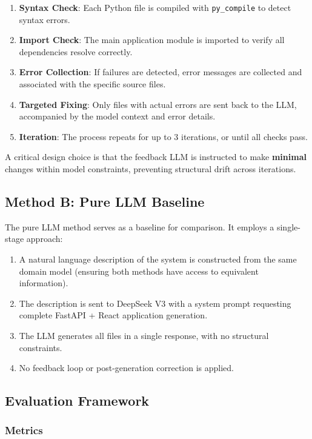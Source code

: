 \documentclass[11pt,a4paper]{article}
\begin{document}
\begin{enumerate}[leftmargin=*]
    \item \textbf{Syntax Check}: Each Python file is compiled with {\lstinline|py_compile|} to detect syntax errors.
    \item \textbf{Import Check}: The main application module is imported to verify all dependencies resolve correctly.
    \item \textbf{Error Collection}: If failures are detected, error messages are collected and associated with the specific source files.
    \item \textbf{Targeted Fixing}: Only files with actual errors are sent back to the LLM, accompanied by the model context and error details.
    \item \textbf{Iteration}: The process repeats for up to 3 iterations, or until all checks pass.
\end{enumerate}

A critical design choice is that the feedback LLM is instructed to make \textbf{minimal} changes within model constraints, preventing structural drift across iterations.

\subsection{Method B: Pure LLM Baseline}

The pure LLM method serves as a baseline for comparison. It employs a single-stage approach:

\begin{enumerate}[leftmargin=*]
    \item A natural language description of the system is constructed from the same domain model (ensuring both methods have access to equivalent information).
    \item The description is sent to DeepSeek V3 with a system prompt requesting complete FastAPI + React application generation.
    \item The LLM generates all files in a single response, with no structural constraints.
    \item No feedback loop or post-generation correction is applied.
\end{enumerate}

\subsection{Evaluation Framework}

\subsubsection{Metrics}
\end{document}

